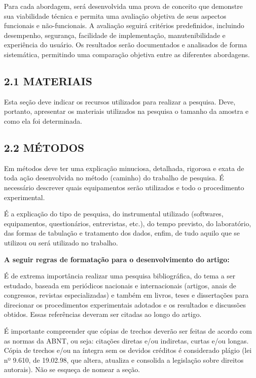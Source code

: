 \documentclass[
]{article}
\begin{document}
Para cada abordagem, será desenvolvida uma prova de conceito que
demonstre sua viabilidade técnica e permita uma avaliação objetiva de
seus aspectos funcionais e não-funcionais. A avaliação seguirá critérios
predefinidos, incluindo desempenho, segurança, facilidade de
implementação, manutenibilidade e experiência do usuário. Os resultados
serão documentados e analisados de forma sistemática, permitindo uma
comparação objetiva entre as diferentes abordagens.

\subsection{2.1 MATERIAIS}\label{materiais}

Esta seção deve indicar os recursos utilizados para realizar a pesquisa.
Deve, portanto, apresentar os materiais utilizados na pesquisa o tamanho
da amostra e como ela foi determinada.

\subsection{2.2 MÉTODOS}\label{muxe9todos}

Em métodos deve ter uma explicação minuciosa, detalhada, rigorosa e
exata de toda ação desenvolvida no método (caminho) do trabalho de
pesquisa. É necessário descrever quais equipamentos serão utilizados e
todo o procedimento experimental.

É a explicação do tipo de pesquisa, do instrumental utilizado
(softwares, equipamentos, questionários, entrevistas, etc.), do tempo
previsto, do laboratório, das formas de tabulação e tratamento dos
dados, enfim, de tudo aquilo que se utilizou ou será utilizado no
trabalho.

\textbf{A seguir regras de formatação para o desenvolvimento do artigo:}

É de extrema importância realizar uma pesquisa bibliográfica, do tema a
ser estudado, baseada em periódicos nacionais e internacionais (artigos,
anais de congressos, revistas especializadas) e também em livros, teses
e dissertações para direcionar os procedimentos experimentais adotados e
os resultados e discussões obtidos. Essas referências deveram ser
citadas ao longo do artigo.

É importante compreender que cópias de trechos deverão ser feitas de
acordo com as normas da ABNT, ou seja: citações diretas e/ou indiretas,
curtas e/ou longas. Cópia de trechos e/ou na íntegra sem os devidos
créditos é considerado plágio (lei nº 9.610, de 19.02.98, que altera,
atualiza e consolida a legislação sobre direitos autorais). Não se
esqueça de nomear a seção.
\end{document}
